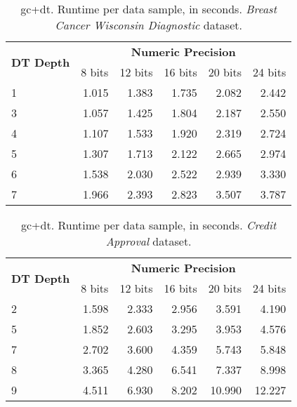 \begin{table}[!h]
\centering
\caption{\acs{gc}+\acs{dt}. Runtime per data sample, in seconds. \emph{Breast Cancer Wisconsin Diagnostic} dataset.}
\label{table:runtimeDTBCW}
\vspace*{0.2cm}
\begin{tabular}{|l|r|r|r|r|r|}
\hline
\multirow{2}{*}{\textbf{DT Depth}} & \multicolumn{5}{c|}{\textbf{Numeric Precision}}         \\ \cline{2-6} 
                          & 8 bits & 12 bits & 16 bits & 20 bits & 24 bits \\ \hline
1                         & 1.015  & 1.383   & 1.735   & 2.082   & 2.442   \\ \hline
3                         & 1.057  & 1.425   & 1.804   & 2.187   & 2.550   \\ \hline
4                         & 1.107  & 1.533   & 1.920   & 2.319   & 2.724   \\ \hline
5                         & 1.307  & 1.713   & 2.122   & 2.665   & 2.974   \\ \hline
6                         & 1.538  & 2.030   & 2.522   & 2.939   & 3.330   \\ \hline
7                         & 1.966  & 2.393   & 2.823   & 3.507   & 3.787   \\ \hline
\end{tabular}
\end{table}


\begin{table}[!h]
\centering
\caption{\acs{gc}+\acs{dt}. Runtime per data sample, in seconds. \emph{Credit Approval} dataset.}
\label{table:runtimeDTCA}
\vspace*{0.2cm}
\begin{tabular}{|l|r|r|r|r|r|}
\hline
\multirow{2}{*}{\textbf{DT Depth}} & \multicolumn{5}{c|}{\textbf{Numeric Precision}}         \\ \cline{2-6} 
                          & 8 bits & 12 bits & 16 bits & 20 bits & 24 bits \\ \hline
2                         & 1.598  & 2.333   & 2.956   & 3.591   & 4.190   \\ \hline
5                         & 1.852  & 2.603   & 3.295   & 3.953   & 4.576   \\ \hline
7                         & 2.702  & 3.600   & 4.359   & 5.743   & 5.848   \\ \hline
8                         & 3.365  & 4.280   & 6.541   & 7.337   & 8.998   \\ \hline
9                         & 4.511  & 6.930   & 8.202   & 10.990  & 12.227  \\ \hline
\end{tabular}
\end{table}


